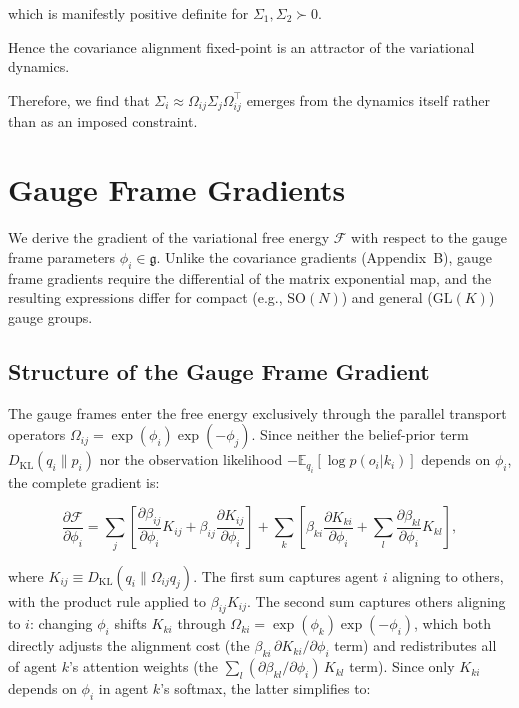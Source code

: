 \documentclass[twoside,11pt]{article}
\begin{document}
which is manifestly positive definite for $\Sigma_1,\Sigma_2 \succ 0$.

Hence the covariance alignment fixed-point is an attractor of the variational dynamics.

Therefore, we find that $\Sigma_i \approx \Omega_{ij}\Sigma_j\Omega_{ij}^\top$ emerges from the dynamics itself rather than as an imposed constraint.


\section{Gauge Frame Gradients}
\label{app:phi_gradients}

We derive the gradient of the variational free energy $\mathcal{F}$ with respect to the gauge frame parameters $\phi_i \in \mathfrak{g}$. Unlike the covariance gradients (Appendix~B), gauge frame gradients require the differential of the matrix exponential map, and the resulting expressions differ for compact (e.g., $\mathrm{SO}(N)$) and general ($\mathrm{GL}(K)$) gauge groups.

\subsection{Structure of the Gauge Frame Gradient}

The gauge frames enter the free energy exclusively through the parallel transport operators $\Omega_{ij} = \exp(\phi_i)\exp(-\phi_j)$. Since neither the belief-prior term $D_{\mathrm{KL}}(q_i \| p_i)$ nor the observation likelihood $-\mathbb{E}_{q_i}[\log p(o_i | k_i)]$ depends on $\phi_i$, the complete gradient is:

\begin{equation}
\frac{\partial \mathcal{F}}{\partial \phi_i}
= \sum_j \left[
\frac{\partial \beta_{ij}}{\partial \phi_i} K_{ij}
+ \beta_{ij} \frac{\partial K_{ij}}{\partial \phi_i}
\right]
+ \sum_k \left[
\beta_{ki} \frac{\partial K_{ki}}{\partial \phi_i}
+ \sum_l \frac{\partial \beta_{kl}}{\partial \phi_i} K_{kl}
\right],
\label{eq:phi_grad_complete}
\end{equation}

where $K_{ij} \equiv D_{\mathrm{KL}}(q_i \| \Omega_{ij} q_j)$. The first sum captures agent $i$ aligning to others, with the product rule applied to $\beta_{ij} K_{ij}$. The second sum captures others aligning to $i$: changing $\phi_i$ shifts $K_{ki}$ through $\Omega_{ki} = \exp(\phi_k)\exp(-\phi_i)$, which both directly adjusts the alignment cost (the $\beta_{ki}\,\partial K_{ki}/\partial \phi_i$ term) and redistributes all of agent $k$'s attention weights (the $\sum_l (\partial \beta_{kl}/\partial \phi_i)\, K_{kl}$ term). Since only $K_{ki}$ depends on $\phi_i$ in agent $k$'s softmax, the latter simplifies to:
\end{document}
